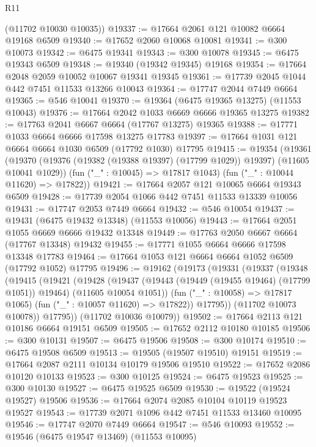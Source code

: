 \begin{lexlean}{R11}
\begin{coremodule}
      (@11702 @10030 @10035))
@19337 := @17664 @2061 @121 @10082 @6664 @19168 @6509
@19340 := @17652 @2060 @10068 @10081
@19341 := @300 @10073
@19342 := @6475 @19341
@19343 := @300 @10078
@19345 := @6475 @19343 @6509
@19348 := @19340 (@19342 @19345) @19168
@19354 := @17664 @2048 @2059 @10052 @10067 @19341 @19345
@19361 := @17739 @2045 @1044 @442 @7451 @11533 @13266 @10043
@19364 := @17747 @2044 @7449 @6664
@19365 := @546 @10041
@19370 := @19364 (@6475 @19365 @13275) (@11553 @10043)
@19376 := @17664 @2042 @1033 @6669 @6666 @19365 @13275
@19382 := @17763 @2041 @6667 @6664 (@17767 @13275) @19365
@19388 := @17771 @1033 @6664 @6666 @17598 @13275 @17783
@19397 := @17664 @1031 @121 @6664 @6664 @1030 @6509 (@17792 @1030) @17795
@19415 := @19354
    (@19361
      (@19370 (@19376 (@19382 (@19388 @19397) (@17799 @1029)) @19397) (@11605 @10041 @1029))
      (fun ("_" : @10045) => @17817 @1043)
      (fun ("_" : @10044 @11620) => @17822))
@19421 := @17664 @2057 @121 @10065 @6664 @19343 @6509
@19428 := @17739 @2054 @1066 @442 @7451 @11533 @13339 @10056
@19431 := @17747 @2053 @7449 @6664
@19432 := @546 @10054
@19437 := @19431 (@6475 @19432 @13348) (@11553 @10056)
@19443 := @17664 @2051 @1055 @6669 @6666 @19432 @13348
@19449 := @17763 @2050 @6667 @6664 (@17767 @13348) @19432
@19455 := @17771 @1055 @6664 @6666 @17598 @13348 @17783
@19464 := @17664 @1053 @121 @6664 @6664 @1052 @6509 (@17792 @1052) @17795
@19496 := @19162
    (@19173
      (@19331
        (@19337
          (@19348
            (@19415
              (@19421
                (@19428
                  (@19437
                    (@19443 (@19449 (@19455 @19464) (@17799 @1051)) @19464)
                    (@11605 @10054 @1051))
                  (fun ("_" : @10058) => @17817 @1065)
                  (fun ("_" : @10057 @11620) => @17822))
                @17795))
            (@11702 @10073 @10078))
          @17795))
      (@11702 @10036 @10079))
@19502 := @17664 @2113 @121 @10186 @6664 @19151 @6509
@19505 := @17652 @2112 @10180 @10185
@19506 := @300 @10131
@19507 := @6475 @19506
@19508 := @300 @10174
@19510 := @6475 @19508 @6509
@19513 := @19505 (@19507 @19510) @19151
@19519 := @17664 @2087 @2111 @10134 @10179 @19506 @19510
@19522 := @17652 @2086 @10120 @10133
@19523 := @300 @10125
@19524 := @6475 @19523
@19525 := @300 @10130
@19527 := @6475 @19525 @6509
@19530 := @19522 (@19524 @19527) @19506
@19536 := @17664 @2074 @2085 @10104 @10119 @19523 @19527
@19543 := @17739 @2071 @1096 @442 @7451 @11533 @13460 @10095
@19546 := @17747 @2070 @7449 @6664
@19547 := @546 @10093
@19552 := @19546 (@6475 @19547 @13469) (@11553 @10095)

\end{coremodule}
\end{lexlean}
